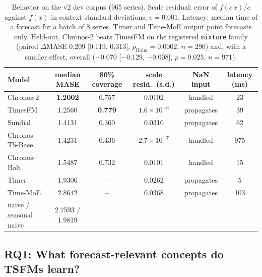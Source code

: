 \begin{table}[tb]
\centering
\footnotesize
\setlength{\tabcolsep}{4pt}
\begin{tabular}{@{}lccccc@{}}
\toprule
Model & median MASE & 80\% coverage & scale resid.\ (s.d.) & NaN input & latency (ms) \\
\midrule
\textcolor{ctwo}{Chronos-2}    & \textbf{1.2002} & 0.757 & 0.0102 & handled & 23 \\
\textcolor{tfm}{TimesFM}       & 1.2560 & \textbf{0.779} & $1.6\times10^{-6}$ & propagates & 39 \\
\textcolor{sun}{Sundial}       & 1.4131 & 0.360 & 0.0310 & propagates & 62 \\
\textcolor{tt5}{Chronos-T5-Base} & 1.4231 & 0.436 & $2.7\times10^{-7}$ & handled & 975 \\
\textcolor{bolt}{Chronos-Bolt} & 1.5487 & 0.732 & 0.0101 & handled & 15 \\
\textcolor{timer}{Timer}       & 1.9306 & -- & 0.0262 & propagates & 5 \\
\textcolor{tmoe}{Time-MoE}     & 2.8642 & -- & 0.0368 & propagates & 103 \\
\midrule
naive / seasonal naive & 2.7593 / 1.9819 & & & & \\
\bottomrule
\end{tabular}
\caption{Behavior on the v2 dev corpus (965 series). Scale residual: error of $f(c\,x)/c$ against $f(x)$ in context
standard deviations, $c=0.001$. Latency: median time of a forecast for a batch of 8 series. Timer and Time-MoE output
point forecasts only. Held-out, Chronos-2 beats TimesFM on the registered \texttt{mixture} family (paired
$\Delta$MASE 0.209 [0.119, 0.313], $p_{\text{Holm}}=0.0002$, $n=290$) and, with a smaller effect, overall ($-0.070$
[$-0.129$, $-0.008$], $p=0.025$, $n=971$).}
\label{tab:character}
\end{table}

\subsection{RQ1: What forecast-relevant concepts do TSFMs learn?}
\label{sec:rq1}

